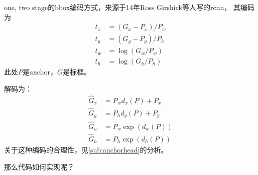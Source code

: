 \documentclass[UTF8]{ctexart}
\begin{document}
one, two stage的bbox编码方式，来源于14年Ross Girshick等人写的rcnn，
其编码为
$$
\begin{aligned}
	t_{x} &=\left(G_{x}-P_{x}\right) / P_{w} \label{1} \\
	t_{y} &=\left(G_{y}-P_{y}\right) / P_{h} \label{2}\\
	t_{w} &=\log \left(G_{w} / P_{w}\right)  \label{3}\\
	t_{h} &=\log \left(G_{h} / P_{h}\right)  \label{4}
\end{aligned}
$$
此处$P$是anchor，$G$是标框。

解码为：
$$
\begin{aligned}
	\hat{G}_{x} &=P_{w} d_{x}(P)+P_{x} \\
	\hat{G}_{y} &=P_{h} d_{y}(P)+P_{y} \\
	\hat{G}_{w} &=P_{w} \exp \left(d_{w}(P)\right) \\
	\hat{G}_{h} &=P_{h} \exp \left(d_{h}(P)\right)
\end{aligned}
$$
关于这种编码的合理性，见\ref{sub:anchorhead}的分析。

那么代码如何实现呢？
\end{document}

